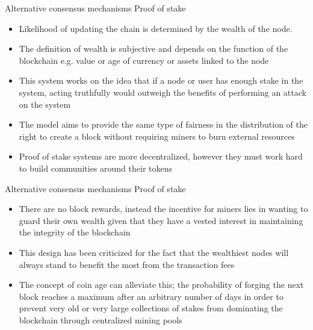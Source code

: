 \documentclass[10pt]{beamer}
\begin{document}

\begin{frame}{Alternative consensus mechanisms}
	Proof of stake
	\begin{itemize}
		\item Likelihood of updating the chain is determined by the wealth of the node.
		\item The definition of wealth is subjective and depends on the function of the blockchain e.g. value or age of currency or assets linked to the node
		\item This system works on the idea that if a node or user has enough stake in the system, acting truthfully would outweigh the benefits of performing an attack on the system
		\item The model aims to provide the same type of fairness in the distribution of the right to create a block without requiring miners to burn external resources
		\item Proof of stake systems are more decentralized, however they must work hard to build communities around their tokens
	\end{itemize}
\end{frame}


\begin{frame}{Alternative consensus mechanisms}
	Proof of stake
	\begin{itemize}
		\item There are no block rewards, instead the incentive for miners lies in wanting to guard their own wealth given that they have a vested interest in maintaining the integrity of the blockchain
		\item This design has been criticized for the fact that the wealthiest nodes will always stand to benefit the most from the transaction fees
		\item The concept of coin age can alleviate this; the probability of forging the next block reaches a maximum after an arbitrary number of days in order to prevent very old or very large collections of stakes from dominating the blockchain through centralized mining pools
	\end{itemize}
\end{frame}

\end{document}
